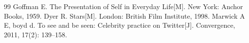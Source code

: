 \begin{thebibliography}{99}
 Goffman E. The Presentation of Self in Everyday Life[M]. New York: Anchor Books, 1959.
 Dyer R. Stars[M]. London: British Film Institute, 1998.
 Marwick A E, boyd d. To see and be seen: Celebrity practice on Twitter[J]. Convergence, 2011, 17(2): 139--158.
\end{thebibliography}
